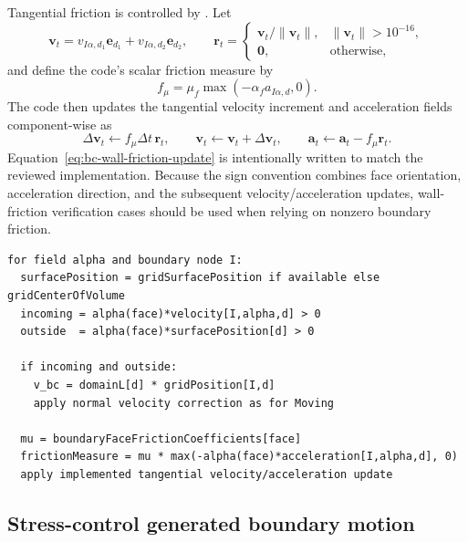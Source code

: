 Tangential friction is controlled by .  Let
\begin{equation}
  \mathbf{v}_t = v_{I\alpha,d_1}\mathbf{e}_{d_1}+v_{I\alpha,d_2}\mathbf{e}_{d_2},
  \qquad
  \mathbf{r}_t = \begin{cases}
    \mathbf{v}_t/\lVert\mathbf{v}_t\rVert, & \lVert\mathbf{v}_t\rVert>10^{-16},\\
    \mathbf{0}, & \text{otherwise},
  \end{cases}
\end{equation}
and define the code's scalar friction measure by
\begin{equation}
  f_\mu = \mu_f\max\left(-\alpha_f a_{I\alpha,d},0\right).
  \label{eq:bc-wall-friction-scalar}
\end{equation}
The code then updates the tangential velocity increment and acceleration fields component-wise as
\begin{equation}
  \Delta\mathbf{v}_t \leftarrow f_\mu\Delta t\,\mathbf{r}_t,
  \qquad
  \mathbf{v}_t \leftarrow \mathbf{v}_t+\Delta\mathbf{v}_t,
  \qquad
  \mathbf{a}_t \leftarrow \mathbf{a}_t-f_\mu\mathbf{r}_t.
  \label{eq:bc-wall-friction-update}
\end{equation}
Equation~\eqref{eq:bc-wall-friction-update} is intentionally written to match the reviewed implementation.  Because the sign convention combines face orientation, acceleration direction, and the subsequent velocity/acceleration updates, wall-friction verification cases should be used when relying on nonzero boundary friction.

\begin{lstlisting}[caption={Contact-face wall update.}]
for field alpha and boundary node I:
  surfacePosition = gridSurfacePosition if available else gridCenterOfVolume
  incoming = alpha(face)*velocity[I,alpha,d] > 0
  outside  = alpha(face)*surfacePosition[d] > 0

  if incoming and outside:
    v_bc = domainL[d] * gridPosition[I,d]
    apply normal velocity correction as for Moving

  mu = boundaryFaceFrictionCoefficients[face]
  frictionMeasure = mu * max(-alpha(face)*acceleration[I,alpha,d], 0)
  apply implemented tangential velocity/acceleration update
\end{lstlisting}

\subsection{Stress-control generated boundary motion}
\label{subsec:bc-stress-control-internals}

